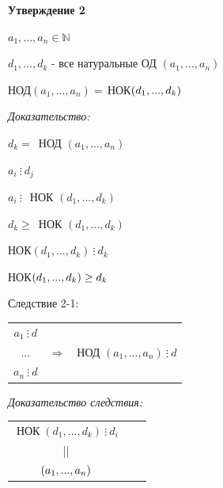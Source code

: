 \documentclass[12pt]{article}
\let\gcd\relax
\DeclareMathOperator{\gcd}{НОД}
\DeclareMathOperator{\lcm}{НОК}
\begin{document}
\textbf{Утверждение 2}\par
$a_1,...,a_n \in \mathbb{N}$\par
$d_1,...,d_k$ - все натуральные ОД $(a_1,...,a_n)$\par
НОД$(a_1,...,a_n)=\,$НОК$(d_1,...,d_k) \newline$\par
\textit{Доказательство:}\par
$d_k =\,$ НОД $(a_1,...,a_n)$\par
$a_i \ \vdots\  d_j$\par
$a_i \ \vdots\  \,$ НОК $(d_1,...,d_k)$\par
$d_k \geq \,$ НОК $(d_1,...,d_k)$\par
НОК$(d_1,...,d_k)\ \vdots\  d_k$\par
НОК$(d_1,...,d_k) \geq d_k \newline$\par
Следствие 2-1:\par
\begin{tabular}{ccc}
    $a_1 \ \vdots\  d$                                     \\
    ... & $\Rightarrow$ & НОД $(a_1,...,a_n) \ \vdots\  d$ \\
    $a_n \ \vdots\  d$                                     \\
\end{tabular}\par
\textit{Доказательство следствия:}\par
\begin{tabular}{ccc}
    $\lcm(d_1,...,d_k) \ \vdots\  d_i$ \\
    ||                                 \\
    $\gcd(a_1,...,a_n)$                \\
\end{tabular}\par
\end{document}
